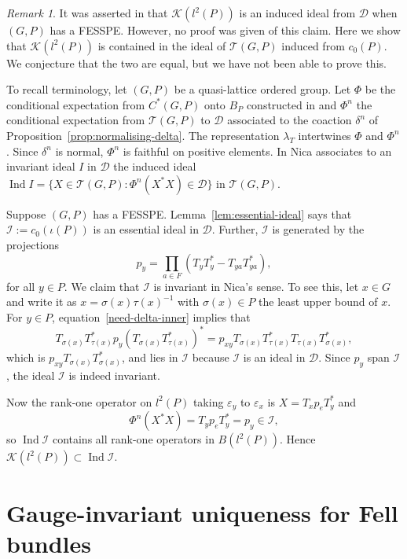 \documentclass[12pt]{amsart}
\theoremstyle{plain}
\theoremstyle{remark}
\newtheorem{rmk}[theorem]{Remark}
\theoremstyle{definition}
\numberwithin{equation}{section}
\theoremstyle{plain}
\theoremstyle{definition}
\theoremstyle{remark}
\begin{document}
\begin{rmk}
It was asserted in \cite[\S 6.3, Remark 4]{N} that ${\mathcal K}(l^2(P))$ is an induced ideal
from ${\mathcal D}$ when $(G, P)$ has a {FESSPE}. However, no proof was given of this claim. Here we show that ${\mathcal K}(l^2(P))$ is
contained in the ideal of ${\mathcal T}(G, P)$ induced from $c_0(P)$. We conjecture that the two
are equal, but we have not been able to prove this.

To recall terminology, let $(G, P)$ be a quasi-lattice ordered group. Let $\Phi$ be the conditional expectation from $C^*(G, P)$
onto $B_P$ constructed in \cite{LacR1} and $\Phi^{n}$ the conditional expectation from
${\mathcal T}(G, P)$ to ${\mathcal D}$ associated to the coaction
$\delta^{n}$ of Proposition~\ref{prop:normalising-delta}. The representation
$\lambda_T$ intertwines $\Phi$ and $\Phi^{n}$. Since $\delta^{n}$ is
normal, $\Phi^{n}$ is faithful on positive elements. In \cite[\S 6]{N} Nica associates to an invariant ideal $I$ in ${\mathcal D}$
the induced ideal  ${\operatorname{Ind}}{I}=\{X\in{\mathcal T}(G, P): \Phi^{n}(X^*X)\in {\mathcal D}\}$ in ${\mathcal T}(G, P)$.

Suppose $(G, P)$ has a {FESSPE}.  Lemma~\ref{lem:essential-ideal} says that
${\mathcal I}:=c_0(\iota(P))$ is an essential ideal in
${\mathcal D}$. Further, ${\mathcal I}$ is generated by the projections
$$
p_y=\prod_{a\in F} (T_yT_y^*-T_{ya}T_{ya}^*),
$$
for all $y\in P$. We claim that ${\mathcal I}$ is invariant in Nica's sense. To see this, let $x\in G$ and write it as $x=\sigma(x)\tau(x)^{-1}$
with $\sigma(x)\in P$ the least upper bound of $x$. For $y\in P$,  equation~\eqref{need-delta-inner} implies that
$$
T_{\sigma(x)}T_{\tau(x)}^*p_y (T_{\sigma(x)}T_{\tau(x)}^*)^*=p_{xy}T_{\sigma(x)}T_{\tau(x)}^*T_{\tau(x)}T_{\sigma(x)}^*,
$$
which is $p_{xy}T_{\sigma(x)}T_{\sigma(x)}^*$, and lies in ${\mathcal I}$ because ${\mathcal I}$ is an ideal in ${\mathcal D}$.
Since $p_y$ span ${\mathcal I}$, the ideal ${\mathcal I}$ is indeed invariant.

Now the rank-one operator on $l^2(P)$ taking $\varepsilon_y$ to $\varepsilon_x$ is $X=T_xp_eT_y^*$ and
$$
\Phi^{n}(X^*X)=T_yp_eT_y^*=p_y\in {\mathcal I},
$$
so ${\operatorname{Ind}} {\mathcal I}$ contains all rank-one operators in $B(l^2(P))$. Hence ${\mathcal K}(l^2(P))\subset {\operatorname{Ind}} {\mathcal I}$.
\end{rmk}

\appendix
\section{Gauge-invariant uniqueness for Fell bundles}
 \label{appendix}
\end{document}
